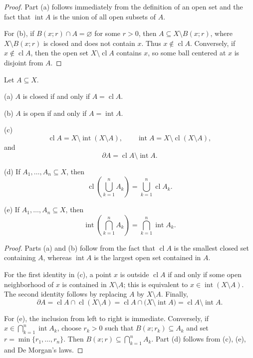 \begin{proof}
Part (a) follows immediately from the definition of an open set and the fact
that $\operatorname{int}A$ is the union of all open subsets of $A$.

For (b), if $B(x;r)\cap A=\varnothing$ for some $r>0$, then
$A\subseteq X\setminus B(x;r)$, where $X\setminus B(x;r)$ is closed and does
not contain $x$. Thus $x\notin\operatorname{cl}A$. Conversely, if
$x\notin\operatorname{cl}A$, then the open set
$X\setminus\operatorname{cl}A$ contains $x$, so some ball centered at $x$ is
disjoint from $A$.
\end{proof}

\begin{thm}
Let $A\subseteq X$.

(a) $A$ is closed if and only if $A=\operatorname{cl}A$.

(b) $A$ is open if and only if $A=\operatorname{int}A$.

(c)
\[
\operatorname{cl}A=X\setminus\operatorname{int}(X\setminus A),\qquad
\operatorname{int}A=X\setminus\operatorname{cl}(X\setminus A),
\]
and
\[
\partial A=\operatorname{cl}A\setminus\operatorname{int}A.
\]

(d) If $A_1,\ldots,A_n\subseteq X$, then
\[
\operatorname{cl}\left(\bigcup_{k=1}^n A_k\right)
=\bigcup_{k=1}^n\operatorname{cl}A_k.
\]

(e) If $A_1,\ldots,A_n\subseteq X$, then
\[
\operatorname{int}\left(\bigcap_{k=1}^n A_k\right)
=\bigcap_{k=1}^n\operatorname{int}A_k.
\]
\end{thm}

\begin{proof}
Parts (a) and (b) follow from the fact that $\operatorname{cl}A$ is the
smallest closed set containing $A$, whereas $\operatorname{int}A$ is the
largest open set contained in $A$.

For the first identity in (c), a point $x$ is outside $\operatorname{cl}A$ if
and only if some open neighborhood of $x$ is contained in $X\setminus A$;
this is equivalent to $x\in\operatorname{int}(X\setminus A)$. The second
identity follows by replacing $A$ by $X\setminus A$. Finally,
\[
\partial A
=\operatorname{cl}A\cap\operatorname{cl}(X\setminus A)
=\operatorname{cl}A\cap\bigl(X\setminus\operatorname{int}A\bigr)
=\operatorname{cl}A\setminus\operatorname{int}A.
\]

For (e), the inclusion from left to right is immediate. Conversely, if
$x\in\bigcap_{k=1}^n\operatorname{int}A_k$, choose $r_k>0$ such that
$B(x;r_k)\subseteq A_k$ and set $r=\min\{r_1,\ldots,r_n\}$. Then
$B(x;r)\subseteq\bigcap_{k=1}^n A_k$. Part (d) follows from (c), (e), and De
Morgan's laws.
\end{proof}

